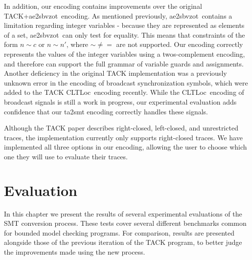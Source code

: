 \documentclass[a4paper,11pt]{report}
\theoremstyle{definition}
\newcommand{\cltloc}{CLTLoc}
\newcommand{\aez}{ae2sbvzot}
\begin{document}
In addition, our encoding contains improvements over the original TACK+\aez\
encoding. As mentioned previously, \aez\ contains a limitation regarding integer
variables - because they are represented as elements of a set, \aez\ can only
test for equality. This means that constraints of the form $n \sim c$ or
$n \sim n'$, where $\sim \neq =$ are not supported. Our encoding correctly
represents the values of the integer variables using a twos-complement encoding,
and therefore can support the full grammar of variable guards and assignments.
Another deficiency in the original TACK implementation was a previously unknown
error in the encoding of broadcast synchronization symbols, which were added to
the TACK \cltloc\ encoding recently. While the \cltloc\ encoding of broadcast
signals is still a work in progress, our experimental evaluation adds confidence
that our ta2smt encoding correctly handles these signals.


Although the TACK paper describes right-closed, left-closed, and unrestricted
traces, the implementation currently only supports right-closed traces. We have
implemented all three options in our encoding, allowing the user to choose which
one they will use to evaluate their traces.

\chapter{Evaluation}\label{evaluation}
In this chapter we present the results of several experimental evaluations of
the SMT conversion process. These tests cover several different benchmarks
common for bounded model checking programs. For comparison, results are
presented alongside those of the previous iteration of the TACK program, to
better judge the improvements made using the new process.
\end{document}
